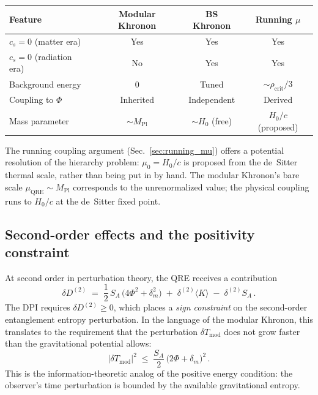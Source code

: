 \documentclass[prd,twocolumn,superscriptaddress,longbibliography,floatfix]{revtex4-2}
\newcommand{\abs}[1]{\left|#1\right|}
\newcommand{\Tmod}{T_{\mathrm{mod}}}
\begin{document}
\begin{center}
\begin{tabular}{lccc}
\textbf{Feature} &
\textbf{Modular Khronon} &
\textbf{BS Khronon} &
\textbf{Running $\mu$} \\
\hline
$c_s = 0$ (matter era) & Yes & Yes & Yes \\
$c_s = 0$ (radiation era) & No & Yes & Yes \\
Background energy & 0 & Tuned & $\sim\!\rho_{\mathrm{crit}}/3$ \\
Coupling to $\Phi$ & Inherited & Independent & Derived \\
Mass parameter & $\sim M_{\mathrm{Pl}}$ & $\sim H_0$ (free) & $H_0/c$ (proposed) \\
\end{tabular}
\end{center}

The running coupling argument
(Sec.~\ref{sec:running_mu}) offers a potential
resolution of the hierarchy problem: $\mu_0 = H_0/c$
is proposed from the de~Sitter thermal scale, rather
than being put in by hand.
The modular Khronon's bare scale
$\mu_{\mathrm{QRE}} \sim M_{\mathrm{Pl}}$ corresponds
to the unrenormalized value; the physical coupling runs
to $H_0/c$ at the de~Sitter fixed point.

\subsection{Second-order effects and the positivity constraint}

At second order in perturbation theory, the QRE receives a
contribution
\begin{equation}
\delta D^{(2)} \;=\; \frac{1}{2}\,S_A\,
\bigl(4\Phi^2 + \delta_m^2\bigr)
\;+\; \delta^{(2)}\!\langle K\rangle
\;-\; \delta^{(2)} S_A\,.
\label{eq:second_order}
\end{equation}
The DPI requires $\delta D^{(2)} \geq 0$, which places a
\emph{sign constraint} on the second-order entanglement
entropy perturbation.  In the language of the modular
Khronon, this translates to the requirement that the
perturbation $\delta\Tmod$ does not grow faster than the
gravitational potential allows:
\begin{equation}
\abs{\delta\Tmod}^2 \;\leq\; \frac{S_A}{2}\,
\bigl(2\Phi + \delta_m\bigr)^2\,.
\label{eq:positivity}
\end{equation}
This is the information-theoretic analog of the positive
energy condition: the observer's time perturbation is
bounded by the available gravitational entropy.
\end{document}
